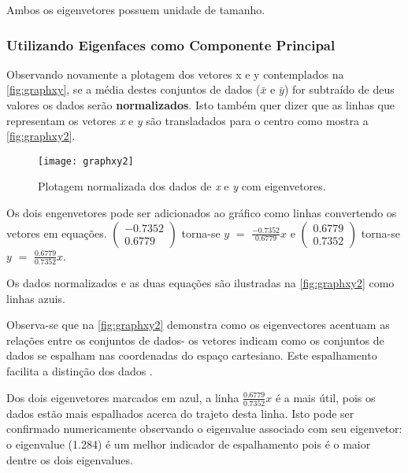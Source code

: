 Ambos os eigenvetores possuem unidade de tamanho.

\subsubsection{Utilizando Eigenfaces como Componente Principal}\label{subsec:eigenacp}

Observando novamente a plotagem dos vetores x e y contemplados na \autoref{fig:graphxy}, se a média destes conjuntos de dados ($\bar{x}$ e $\bar{y}$) for subtraído de deus valores os dados serão \textbf{normalizados}. Isto também quer dizer que as linhas que representam os vetores \textit{x} e \textit{y} são transladados para o centro como mostra a \autoref{fig:graphxy2}. 

\begin{figure}[h]
	\centering
	\texttt{[image: graphxy2]}
	\caption{Plotagem normalizada dos dados de \textit{x} e \textit{y} com eigenvetores.}
	\label{fig:graphxy2}
\end{figure}

Os dois engenvetores pode ser adicionados ao gráfico como linhas convertendo os vetores em equações. 
$\begin{pmatrix} -0.7352 \\ 0.6779 \end{pmatrix}$ torna-se $y$ $=$ $\frac{-0.7352}{0.6779}$$x$  e $\begin{pmatrix} 0.6779 \\ 0.7352 \end{pmatrix}$ torna-se $y$ $=$ $\frac{0.6779}{0.7352}$$x$.

Os dados normalizados e as duas equações são ilustradas na \autoref{fig:graphxy2} como linhas azuis. 

Observa-se que na \autoref{fig:graphxy2} demonstra como os eigenvectores acentuam as relações entre os conjuntos de dados- os vetores indicam como os conjuntos de dados se espalham nas coordenadas do espaço cartesiano. Este espalhamento facilita a distinção dos dados \cite{drmathew_java_programming}.

Dos dois eigenvetores marcados em azul, a linha $\frac{0.6779}{0.7352}$$x$ é a mais útil, pois os dados estão mais espalhados acerca do trajeto desta linha. Isto pode ser confirmado numericamente observando o eigenvalue associado com seu eigenvetor: o eigenvalue (1.284) é um melhor indicador de espalhamento pois é o maior dentre os dois eigenvalues.

